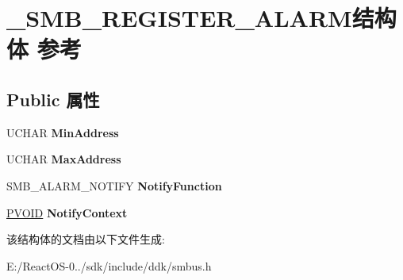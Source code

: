 \hypertarget{struct___s_m_b___r_e_g_i_s_t_e_r___a_l_a_r_m}{}\section{\+\_\+\+S\+M\+B\+\_\+\+R\+E\+G\+I\+S\+T\+E\+R\+\_\+\+A\+L\+A\+R\+M结构体 参考}
\label{struct___s_m_b___r_e_g_i_s_t_e_r___a_l_a_r_m}
\subsection*{Public 属性}
\begin{DoxyCompactItemize}
\item 
\mbox{\label{struct___s_m_b___r_e_g_i_s_t_e_r___a_l_a_r_m_ab5aabd34a6f8e7b9a883238df558fd8c}} 
U\+C\+H\+AR {\bfseries Min\+Address}
\item 
\mbox{\label{struct___s_m_b___r_e_g_i_s_t_e_r___a_l_a_r_m_ae4da9d12889038274666e26510371c7c}} 
U\+C\+H\+AR {\bfseries Max\+Address}
\item 
\mbox{\label{struct___s_m_b___r_e_g_i_s_t_e_r___a_l_a_r_m_a718d80e69a2272cdbcf21d61012687b7}} 
S\+M\+B\+\_\+\+A\+L\+A\+R\+M\+\_\+\+N\+O\+T\+I\+FY {\bfseries Notify\+Function}
\item 
\mbox{\label{struct___s_m_b___r_e_g_i_s_t_e_r___a_l_a_r_m_a76ec823adde8f2fa590374e38f5ca4c2}} 
\hyperlink{interfacevoid}{P\+V\+O\+ID} {\bfseries Notify\+Context}
\end{DoxyCompactItemize}


该结构体的文档由以下文件生成\+:\begin{DoxyCompactItemize}
\item 
E\+:/\+React\+O\+S-\/0../sdk/include/ddk/smbus.\+h\end{DoxyCompactItemize}

